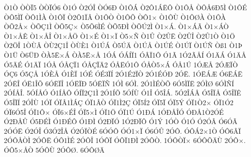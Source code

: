 {^^d21^^d2
^^d2^^d2^^cf5
^^d2^^d2^^cf^^d36
^^d21^^d3
^^d22^^d3^^ce
^^d2^^d36^^d0
^^d21^^d4^^c1
^^d22^^d41^^c1^^cb^^d4
^^d21^^d4^^c5
^^d2^^d4^^c56^^d05^^cc
^^d21^^d4^^c9
^^d2^^d45^^cc^^cf
^^d2^^d41^^cc^^c0
^^d21^^d4^^cf
^^d22^^d41^^cf^^c2
^^d21^^d4^^d2
^^d21^^d4^^d5
^^d2^^d41^^d7
^^d21^^d4^^d9
^^d21^^d4^^d8^^c0
^^d21^^d4^^c0
^^d2^^d52^^c5^^d7
^^d2^^d5^^c71^^cc
^^d2^^d55^^c7^^d7
^^d25^^d56^^cc^^c9
^^d2^^d55^^d0^^cc
^^d2^^d5^^da2^^cc
^^d21^^d7^^c1.
^^d21^^d7^^c1^^c3
^^d21^^d7^^c1^^d2
^^d21^^d7^^c5^^ca
^^d21^^d7^^c5^^ce
^^d21^^d7^^c5^^d6
^^d21^^d7^^c9
^^d21^^d7^^cf
^^d25^^d7^^d1
^^d21^^db
^^d22^^db^^cb
^^d22^^db^^ce
^^d22^^db1^^d2
^^d21^^d6
^^d22^^d6^^ce
1^^d2^^d9^^c2
^^d2^^d92^^c71^^ce
^^d2^^d9^^c81
^^d21^^da^^c1
^^d25^^da^^c4
^^d21^^da^^c5
^^d21^^da^^c9
^^d21^^da^^cf
^^d21^^da^^d1
^^d2^^df1
^^d21^^de
^^d21^^dc
^^d26^^dc^^d0
^^d2^^c05^^cb^^d7^^c1
^^d2^^c05^^cb^^d7^^c5
1^^d3^^c1
^^d3^^c1^^cd^^cf1
^^d3^^c2^^cf1^^d4
^^d31^^c3
1^^d32^^c3^^c5^^cd
^^d31^^c4^^c1
^^d31^^c4^^c5
^^d35^^c4^^c9
^^d31^^c4^^cf
1^^d3^^c5
^^d3^^c5^^c7^^cf1
^^d3^^c5^^c7^^cf^^c42
^^d3^^c5^^cb^^d31^^d4
^^d3^^c5^^d25^^d7^^c1
^^d3^^c51^^da
1^^d3^^c6^^c5
2^^d3^^c6^^cf^^d2
^^d3^^c76
^^d35^^c7^^c5
1^^d3^^c8^^c5
^^d31^^c8^^cf
1^^d3^^c9
^^d3^^c93^^cf^^cd
2^^d31^^c92^^cf^^d2
2^^d31^^c9^^d3^^d0
2^^d3^^cb.
1^^d3^^cb^^c1^^c6
^^d36^^cb^^c1^^cb
2^^d3^^cb^^ce
^^d3^^cb1^^ce^^d5
6^^d3^^cb^^cf^^ce
1^^d3^^cb^^cf^^d0
5^^d3^^cb^^cf^^d1
1^^d3^^cc
6^^d3^^cc.
2^^d31^^cc^^c9^^d2^^d5
6^^d35^^cc^^cf^^cb
2^^d3^^cc^^d8
6^^d3^^cc^^d1^^cd
2^^d3^^cd^^c5^^ce.
5^^d3^^cd^^c5^^d3
^^d31^^cd^^c5^^d4
^^d3^^cd^^cf2^^c71^^cc
2^^d31^^cd^^d5
5^^d3^^cd^^d9
^^d31^^ce
^^d35^^ce^^c1.
5^^d32^^ce^^c1^^c2
^^d35^^ce^^cf^^c5
^^d35^^ce^^cf^^ca
^^d35^^ce^^cf^^cd
2^^d3^^ce^^d9
1^^d3^^cf
^^d3^^cf^^c21^^cc^^c1^^c7
^^d3^^cf1^^c2^^d2
^^d3^^cf1^^cc2^^c7
^^d3^^cf5^^cd2
^^d3^^cf5^^cf
^^d3^^cf5^^dd
^^d3^^cf1^^d22^^d7
^^d3^^cf1^^d32
^^d3^^cf6^^d35^^ce
^^d3^^cf1^^d4^^d7
^^d3^^cf6^^d7^^c9^^ce
^^d3^^cf5^^d7^^cc
^^d3^^cf1^^d6
^^d3^^cf1^^da
^^d31^^d0^^c1
1^^d3^^d0^^c5^^ce^^d3
^^d3^^d0^^c51^^d22^^d3^^c9
^^d32^^d0^^c5^^db
^^d35^^d0^^c9^^cc
^^d31^^d0^^c9^^d4
^^d31^^d0^^cc
^^d32^^d0^^cf^^d3
1^^d32^^d0^^cf^^d4
^^d31^^dd
1^^d3^^d2
^^d31^^d3
^^d32^^d3^^c2
^^d36^^d3^^c3
2^^d3^^d3^^cb
^^d32^^d3^^ce
^^d33^^d32^^ce^^c5
^^d32^^d3^^cf^^d2^^c9
6^^d3^^d3^^d4
^^d3^^d31^^d7^^cf
^^d36^^d3^^db
2^^d3^^d4.
^^d3^^d4^^c12^^d71^^d2
^^d3^^d46^^c2^^cf
2^^d3^^d4^^c5^^d2^^cc
2^^d3^^d4^^cb
^^d3^^d41^^cc^^c9
2^^d3^^d4^^ce
1^^d3^^d4^^cf
^^d3^^d4^^cf1^^d0^^cc
2^^d3^^d4^^d2.
1^^d3^^d4^^d2^^cf^^d7
6^^d3^^d4^^d5^^c4^^d9
2^^d3^^d4^^d7.
^^d3^^d45^^d7^^c5^^d2
5^^d3^^d4^^d9
2^^d3^^d4^^d8.
6^^d3^^d4^^d8^^c4
}
